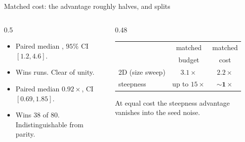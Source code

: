 \documentclass[11pt,aspectratio=169]{beamer}
\begin{document}
\begin{frame}{Matched cost: the advantage roughly halves, and splits}
  \begin{columns}[T]
    \begin{column}{0.5\textwidth}
      \begin{itemize}\itemsep0.4em
        \item Paired median \good{$2.2\times$}, $95\%$ CI $[1.2, 4.6]$.
        \item Wins  runs. Clear of unity.
      \end{itemize}
      \medskip
      \begin{itemize}\itemsep0.4em
        \item Paired median \alert{$0.92\times$}, CI $[0.69, 1.85]$.
        \item Wins \alert{38 of 80}. Indistinguishable from parity.
      \end{itemize}
    \end{column}
    \begin{column}{0.48\textwidth}
      \centering
      \small
      \begin{tabular}{lcc}
        \toprule
                        & matched      & matched \\
                        & budget       & cost    \\
        \midrule
        2D (size sweep) & $3.1\times$  & $\mathbf{2.2\times}$ \\
        steepness       & up to $15\times$ & $\mathbf{\sim\!1\times}$ \\
        \bottomrule
      \end{tabular}
      \medskip\par
      \footnotesize
       At equal cost the
      steepness advantage vanishes into the seed noise.
    \end{column}
  \end{columns}
\end{frame}
\end{document}
